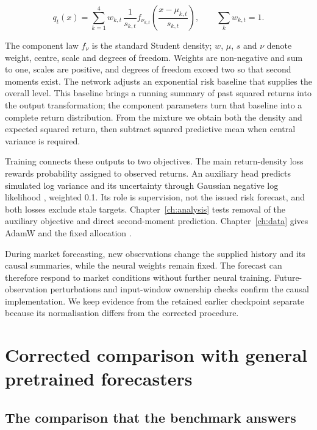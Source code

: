\begin{equation}
 q_t(x)=\sum_{k=1}^{4}w_{k,t}\,
 \frac{1}{s_{k,t}}f_{\nu_{k,t}}\!\left(\frac{x-\mu_{k,t}}{s_{k,t}}\right),
 \qquad \sum_k w_{k,t}=1.
 \label{eq:volpfn-density}
\end{equation}

The component law $f_\nu$ is the standard Student density; $w$, $\mu$, $s$ and $\nu$ denote weight, centre, scale and degrees of freedom. Weights are non-negative and sum to one, scales are positive, and degrees of freedom exceed two so that second moments exist. The network adjusts an exponential risk baseline that supplies the overall level. This baseline brings a running summary of past squared returns into the output transformation; the component parameters turn that baseline into a complete return distribution. From the mixture we obtain both the density and expected squared return, then subtract squared predictive mean when central variance is required.

Training connects these outputs to two objectives. The main return-density loss rewards probability assigned to observed returns. An auxiliary head predicts simulated log variance and its uncertainty through Gaussian negative log likelihood \citep{caruana1997multitask}, weighted 0.1. Its role is supervision, not the issued risk forecast, and both losses exclude stale targets. Chapter~\ref{ch:analysis} tests removal of the auxiliary objective and direct second-moment prediction. Chapter~\ref{ch:data} gives AdamW and the fixed allocation \citep{loshchilov2019decoupled}.

During market forecasting, new observations change the supplied history and its causal summaries, while the neural weights remain fixed. The forecast can therefore respond to market conditions without further neural training. Future-observation perturbations and input-window ownership checks confirm the causal implementation. We keep evidence from the retained earlier checkpoint separate because its normalisation differs from the corrected procedure.

\section{Corrected comparison with general pretrained forecasters}

\subsection{The comparison that the benchmark answers}

